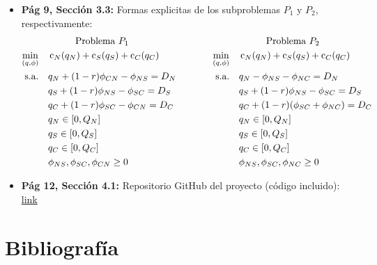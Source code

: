 \documentclass[12pt,twoside]{article}
\begin{document}
	\begin{itemize}
	\item \textbf{P\'ag 9, Secci\'on 3.3:} Formas explicitas de los subproblemas \(P_1\) y \(P_2\), respectivamente:
	\begin{equation*}\begin{aligned}
			& \text{\hspace{1cm}Problema \(P_1\)}& & \text{\hspace{1cm}Problema \(P_2\)}  \\
			\min_{(q,\phi)} \quad & \operatorname{c}_N(q_N)+\operatorname{c}_S(q_S)+\operatorname{c}_C(q_C) & \hspace{1cm} \min_{(q,\phi)} \quad & \operatorname{c}_N(q_N)+\operatorname{c}_S(q_S)+\operatorname{c}_C(q_C) \\
			\textrm{s.a.} \quad & q_N+(1-r)\phi_{CN}-\phi_{NS}=D_N & \textrm{s.a.} \quad & q_N-\phi_{NS}-\phi_{NC}=D_N \\
			& q_S+(1-r)\phi_{NS}-\phi_{SC}=D_S & & q_S+(1-r)\phi_{NS}-\phi_{SC}=D_S \\
			& q_C+(1-r)\phi_{SC}-\phi_{CN}=D_C & & q_C+(1-r)(\phi_{SC}+\phi_{NC})=D_C \\
			& q_N\in[0,Q_N] & & q_N\in[0,Q_N] \\
			& q_S\in[0,Q_S] & & q_S\in[0,Q_S] \\
			& q_C\in[0,Q_C] & & q_C\in[0,Q_C] \\
			& \phi_{NS},\phi_{SC},\phi_{CN}\geq0 & & \phi_{NS},\phi_{SC},\phi_{NC}\geq0 
	\end{aligned}\end{equation*}
		\item \textbf{P\'ag 12, Secci\'on 4.1:} Repositorio GitHub del proyecto (c\'odigo incluido): \href{https://github.com/UFWM/USM_Lab_2023_S2/tree/main}{link}
	\end{itemize}
	
	\section{Bibliograf\'ia}
	
\end{document}
